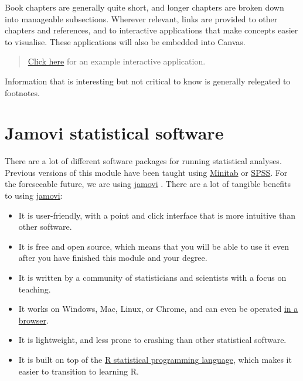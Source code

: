 \documentclass[
]{scrbook}
\providecommand{\tightlist}{%
  \setlength{\itemsep}{0pt}\setlength{\parskip}{0pt}}
\begin{document}
Book chapters are generally quite short, and longer chapters are broken down into manageable subsections.
Wherever relevant, links are provided to other chapters and references, and to interactive applications that make concepts easier to visualise.
These applications will also be embedded into Canvas.

\begin{quote}
\href{https://bradduthie.shinyapps.io/forest/}{Click here} for an example interactive application.
\end{quote}

Information that is interesting but not critical to know is generally relegated to footnotes.

\hypertarget{jamovi}{%
\section*{Jamovi statistical software}\label{jamovi}}

There are a lot of different software packages for running statistical analyses.
Previous versions of this module have been taught using \href{https://www.minitab.com/en-us/}{Minitab} or \href{https://www.ibm.com/uk-en/products/spss-statistics}{SPSS}.
For the foreseeable future, we are using \href{https://www.jamovi.org/}{jamovi} \citep{Jamovi2022}.
There are a lot of tangible benefits to using \href{https://www.jamovi.org/}{jamovi}:

\begin{itemize}
\tightlist
\item
  It is user-friendly, with a point and click interface that is more intuitive than other software.
\item
  It is free and open source, which means that you will be able to use it even after you have finished this module and your degree.
\item
  It is written by a community of statisticians and scientists with a focus on teaching.
\item
  It works on Windows, Mac, Linux, or Chrome, and can even be operated \href{https://www.jamovi.org/cloud.html}{in a browser}.
\item
  It is lightweight, and less prone to crashing than other statistical software.
\item
  It is built on top of the \href{https://www.r-project.org/about.html}{R statistical programming language}, which makes it easier to transition to learning R.
\end{itemize}
\end{document}
